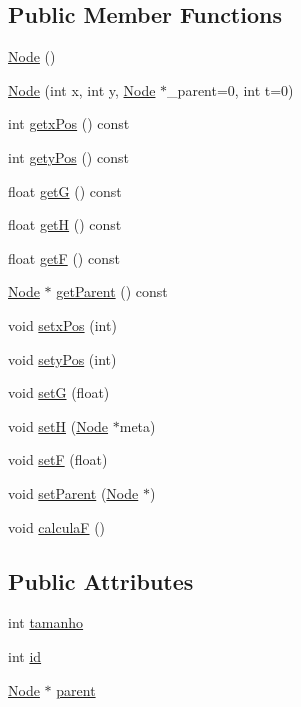 \subsection*{Public Member Functions}
\begin{DoxyCompactItemize}
\item 
\hyperlink{classNode_ad7a34779cad45d997bfd6d3d8043c75f}{Node} ()
\item 
\hyperlink{classNode_a2d13f7f1172705cddb79039c2fabbba6}{Node} (int x, int y, \hyperlink{classNode}{Node} $\ast$\+\_\+parent=0, int t=0)
\item 
int \hyperlink{classNode_a81aba8cc7d7ebd60051bb7cba210f587}{getx\+Pos} () const 
\item 
int \hyperlink{classNode_a7d26325d2355b29184cd6b428a78508b}{gety\+Pos} () const 
\item 
float \hyperlink{classNode_ab72b743b5abe69381e9066f4225793d2}{getG} () const 
\item 
float \hyperlink{classNode_ae6f0fa0586f0bba0a33ec57323849d89}{getH} () const 
\item 
float \hyperlink{classNode_ad22eea937020953945d47dc25667baf3}{getF} () const 
\item 
\hyperlink{classNode}{Node} $\ast$ \hyperlink{classNode_aee7fa50380cd3d5fd82c022e45ba2d37}{get\+Parent} () const 
\item 
void \hyperlink{classNode_a95d9ff38e9706097f752df46e1c912d9}{setx\+Pos} (int)
\item 
void \hyperlink{classNode_afcef18b84545fc9097c67ba6b48f31cb}{sety\+Pos} (int)
\item 
void \hyperlink{classNode_ac269852dd9117461a6069589470c39f1}{setG} (float)
\item 
void \hyperlink{classNode_aa10f28d0b00917bc5106373c73eb636f}{setH} (\hyperlink{classNode}{Node} $\ast$meta)
\item 
void \hyperlink{classNode_a77ef44966d6056821545f6b8acee2031}{setF} (float)
\item 
void \hyperlink{classNode_aaed3b50ac429bae4e3460f19c23a9f71}{set\+Parent} (\hyperlink{classNode}{Node} $\ast$)
\item 
void \hyperlink{classNode_aedfbcdc45d98f312e507e34e18b26093}{calculaF} ()
\end{DoxyCompactItemize}
\subsection*{Public Attributes}
\begin{DoxyCompactItemize}
\item 
int \hyperlink{classNode_ab61bfe3b52ba63f10939bf88270321e0}{tamanho}
\item 
int \hyperlink{classNode_a59a543130a10c95f1e8642cf8c5645e8}{id}
\item 
\hyperlink{classNode}{Node} $\ast$ \hyperlink{classNode_ad8184598cdea70e4bbdfd76f2b0f9e85}{parent}
\end{DoxyCompactItemize}
